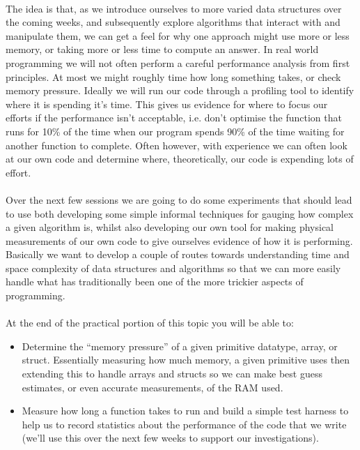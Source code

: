 \documentclass[10pt, a4paper, twosize]{article}
\begin{document}
\paragraph{} The idea is that, as we introduce ourselves to more varied data structures over the coming weeks, and subsequently explore algorithms that interact with and manipulate them, we can get a feel for why one approach might use more or less memory, or taking more or less time to compute an answer. In real world programming we will not often perform a careful performance analysis from first principles. At most we might roughly time how long something takes, or check memory pressure. Ideally we will run our code through a profiling tool to identify where it is spending it's time. This gives us evidence for where to focus our efforts if the performance isn't acceptable, i.e. don't optimise the function that runs for 10\% of the time when our program spends 90\% of the time waiting for another function to complete. Often however, with experience we can often look at our own code and determine where, theoretically, our code is expending lots of effort. 

\paragraph{} Over the next few sessions we are going to do some experiments that should lead to use both developing some simple informal techniques for gauging how complex a given algorithm is, whilst also developing our own tool for making physical measurements of our own code to give ourselves evidence of how it is performing. Basically we want to develop a couple of routes towards understanding time and space complexity of data structures and algorithms so that we can more easily handle what has traditionally been one of the more trickier aspects of programming.

\paragraph{} At the end of the practical portion of this topic you will be able to:

\begin{itemize}
\item Determine the ``memory pressure'' of a given primitive datatype, array, or struct. Essentially measuring how much memory, a given primitive uses then extending this to handle arrays and structs so we can make best guess estimates, or even accurate measurements, of the RAM used.
\item Measure how long a function takes to run and build a simple test harness to help us to record statistics about the performance of the code that we write (we'll use this over the next few weeks to support our investigations).
\end{itemize}
\end{document}
